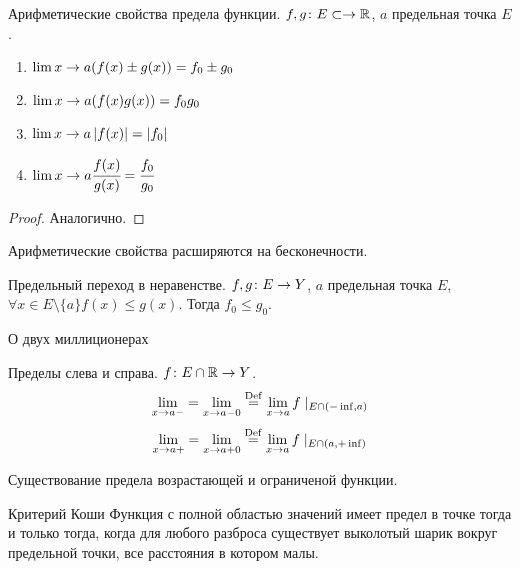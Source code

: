 \begin{theorem}{Арифметические свойства предела функции.}
$f, g\colon E \subset \rightarrow \mathbb{R}$, $a$ предельная точка $E$.
\begin{enumerate}
\item $\lim\limits{x\rightarrow a} (f(x) \pm g(x)) = f_0 \pm g_0$
\item $\lim\limits{x\rightarrow a} (f(x) g(x)) = f_0 g_0$
\item $\lim\limits{x\rightarrow a} \left|f(x)\right| = \left|f_0\right|$
\item $\lim\limits{x\rightarrow a} \cfrac{f(x)}{g(x)}=\cfrac{f_0}{g_0}$
\end{enumerate}
\end{theorem}
\begin{proof}
Аналогично.
\end{proof}

\begin{Rem}
Арифметические свойства расширяются на бесконечности.
\end{Rem}

\begin{theorem}{Предельный переход в неравенстве.}
$f, g\colon E \rightarrow Y$, $a$ предельная точка $E$, $\forall x \in E\setminus \{a\} f(x) \leqslant g(x)$. Тогда $f_0 \leqslant g_0$.
\end{theorem}

\begin{theorem}{О двух миллиционерах}
\end{theorem}

\begin{Def}
Пределы слева и справа. $f\colon E \cap \mathbb{R} \rightarrow Y$.
$$\lim\limits_{x\rightarrow a-} = \lim\limits_{x\rightarrow a-0} \stackrel{\mathrm{Def}}{=} \lim\limits_{x\rightarrow a} f\mid_{E\cap(-\inf,a)}$$
$$\lim\limits_{x\rightarrow a+} = \lim\limits_{x\rightarrow a+0} \stackrel{\mathrm{Def}}{=} \lim\limits_{x\rightarrow a} f\mid_{E\cap(a,+\inf)}$$
\end{Def}

\begin{theorem}{Существование предела возрастающей и ограниченой функции.}

\end{theorem}

\begin{theorem}{Критерий Коши}
Функция с полной областью значений имеет предел в точке тогда и только тогда, когда для любого разброса существует выколотый шарик вокруг предельной точки, все расстояния в котором малы.
\end{theorem}
